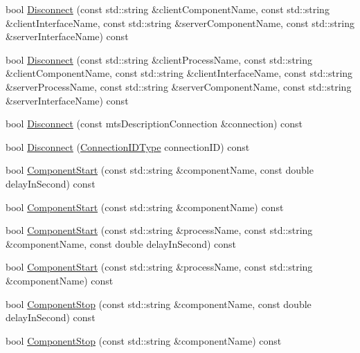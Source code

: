 \begin{DoxyCompactItemize}
\item 
bool \hyperlink{classmts_manager_component_services_af34ce4e333b67f2b93e86faae7892016}{Disconnect} (const std\+::string \&client\+Component\+Name, const std\+::string \&client\+Interface\+Name, const std\+::string \&server\+Component\+Name, const std\+::string \&server\+Interface\+Name) const 
\item 
bool \hyperlink{classmts_manager_component_services_ab3cac9ae1df0551fd62051bd8f5427d8}{Disconnect} (const std\+::string \&client\+Process\+Name, const std\+::string \&client\+Component\+Name, const std\+::string \&client\+Interface\+Name, const std\+::string \&server\+Process\+Name, const std\+::string \&server\+Component\+Name, const std\+::string \&server\+Interface\+Name) const 
\item 
bool \hyperlink{classmts_manager_component_services_add7c94f89a97fd91c5583982ff3a798e}{Disconnect} (const mts\+Description\+Connection \&connection) const 
\item 
bool \hyperlink{classmts_manager_component_services_a3802bce7e028c69a34111ecff65a10e5}{Disconnect} (\hyperlink{mts_forward_declarations_8h_ad3543bb11742e1766374ec96016d6547}{Connection\+I\+D\+Type} connection\+I\+D) const 
\item 
bool \hyperlink{classmts_manager_component_services_ad45767eb085ebfc86cb592fc9023f957}{Component\+Start} (const std\+::string \&component\+Name, const double delay\+In\+Second) const 
\item 
bool \hyperlink{classmts_manager_component_services_a8bb81f817f3a1389f0bbbc4d9807f8bf}{Component\+Start} (const std\+::string \&component\+Name) const 
\item 
bool \hyperlink{classmts_manager_component_services_a4721c9a1743b1fdaf7ce8fd2df0b4de5}{Component\+Start} (const std\+::string \&process\+Name, const std\+::string \&component\+Name, const double delay\+In\+Second) const 
\item 
bool \hyperlink{classmts_manager_component_services_afb90c3acef87baf6a63b3b164bdbfaf5}{Component\+Start} (const std\+::string \&process\+Name, const std\+::string \&component\+Name) const 
\item 
bool \hyperlink{classmts_manager_component_services_a6ff15a84a392361eb15eeb5f2b1a8534}{Component\+Stop} (const std\+::string \&component\+Name, const double delay\+In\+Second) const 
\item 
bool \hyperlink{classmts_manager_component_services_a88a3a6973b09552462a6a776522bfb8f}{Component\+Stop} (const std\+::string \&component\+Name) const 

\end{DoxyCompactItemize}
